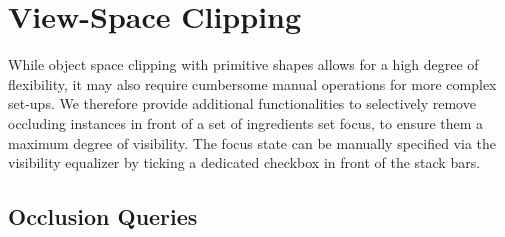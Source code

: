 \section{View-Space Clipping}

While object space clipping with primitive shapes allows for a high degree of flexibility, it may also require cumbersome manual operations for more complex set-ups.
We therefore provide additional functionalities to selectively remove occluding instances in front of a set of ingredients set focus, to ensure them a maximum degree of visibility.
The focus state can be manually specified via the visibility equalizer by ticking a dedicated checkbox in front of the stack bars.

\subsection{Occlusion Queries}
\label{sec:OQ}

